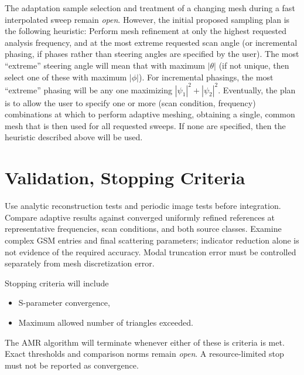 The adaptation sample selection and treatment of a changing mesh during a fast
interpolated sweep remain \emph{open}.  However, the initial proposed sampling
plan is the following heuristic: 
Perform mesh refinement at only the highest requested analysis frequency, and
at the most extreme requested scan angle (or incremental phasing, if phases
rather than steering angles are specified by the user).  The most ``extreme''
steering angle will mean that with maximum $|\theta|$  (if not unique, then
select one of these with maximum $|\phi|$). For incremental phasings,
the most ``extreme'' phasing will be any one maximizing $|\psi_1|^2 + |\psi_2|^2$.
Eventually, the plan is to allow the user to specify one or more
(scan condition, frequency) combinations at which to perform adaptive meshing,
obtaining a single, common mesh that is then used for all requested sweeps.
If none are specified, then the heuristic described above will be used.

\section{Validation, Stopping Criteria}
Use analytic reconstruction tests and periodic image tests before integration.
Compare adaptive results against converged uniformly refined references at
representative frequencies, scan conditions, and both source classes. Examine
complex GSM entries and final scattering parameters; indicator reduction alone
is not evidence of the required accuracy. Modal truncation error must be
controlled separately from mesh discretization error.

Stopping criteria will include
\begin{itemize}
\item S-parameter convergence,
\item Maximum allowed number of triangles exceeded.
\end{itemize}
The AMR algorithm will terminate whenever either of these is criteria is met.
Exact thresholds and comparison
norms remain \emph{open}. A resource-limited stop must not be reported as
convergence. 

